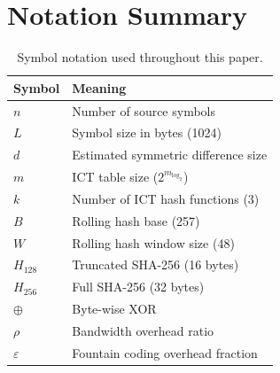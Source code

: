 \documentclass[11pt,twocolumn]{article}
\theoremstyle{definition}
\begin{document}
\section{Notation Summary}

\begin{table}[h]
\centering
\caption{Symbol notation used throughout this paper.}
\begin{tabular}{@{}ll@{}}
\toprule
Symbol & Meaning \\
\midrule
$n$ & Number of source symbols \\
$L$ & Symbol size in bytes (1024) \\
$d$ & Estimated symmetric difference size \\
$m$ & ICT table size ($2^{m_{\log_2}}$) \\
$k$ & Number of ICT hash functions (3) \\
$B$ & Rolling hash base (257) \\
$W$ & Rolling hash window size (48) \\
$H_{128}$ & Truncated SHA-256 (16 bytes) \\
$H_{256}$ & Full SHA-256 (32 bytes) \\
$\oplus$ & Byte-wise XOR \\
$\rho$ & Bandwidth overhead ratio \\
$\varepsilon$ & Fountain coding overhead fraction \\
\bottomrule
\end{tabular}
\end{table}
\end{document}

